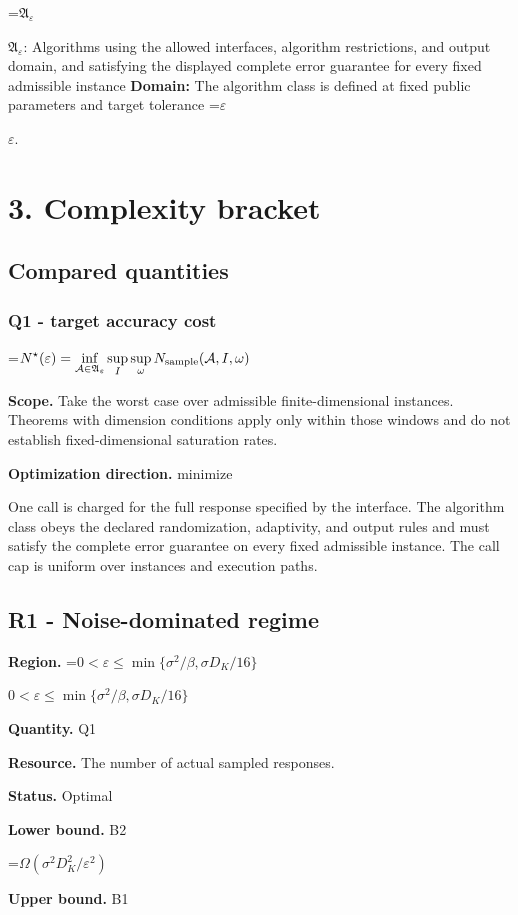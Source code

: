 \documentclass[10pt,a4paper]{article}
\newcommand{\AtlasMath}[1]{\par\begingroup\centering\setbox0=\hbox{$\displaystyle #1$}\ifdim\wd0>1.4\linewidth\typeout{ATLAS WIDE FORMULA: \the\wd0}\fi\ifdim\wd0>\linewidth\resizebox{\linewidth}{!}{\box0}\else\box0\fi\par\endgroup}
\newcommand{\AtlasInlineMath}[1]{\begingroup\setbox0=\hbox{$#1$}\ifdim\wd0>.4\linewidth\endgroup\AtlasMath{#1}\else\endgroup$#1$\fi}
\begin{document}
\AtlasInlineMath{\mathfrak A_\varepsilon}: Algorithms using the allowed interfaces, algorithm restrictions, and output domain, and satisfying the displayed complete error guarantee for every fixed admissible instance \textbf{Domain:} The algorithm class is defined at fixed public parameters and target tolerance \AtlasInlineMath{\varepsilon}.

\section{3. Complexity bracket}
\subsection{Compared quantities}
\subsubsection{Q1 - target accuracy cost}
\AtlasMath{N^\star(\varepsilon)=\inf_{\mathcal A\in\mathfrak A_\varepsilon}\sup_I \sup_\omega N_{\rm sample}(\mathcal A,I,\omega)}
\textbf{Scope.} Take the worst case over admissible finite-dimensional instances. Theorems with dimension conditions apply only within those windows and do not establish fixed-dimensional saturation rates.

\textbf{Optimization direction.} minimize

One call is charged for the full response specified by the interface. The algorithm class obeys the declared randomization, adaptivity, and output rules and must satisfy the complete error guarantee on every fixed admissible instance. The call cap is uniform over instances and execution paths.

\subsection{R1 - Noise-dominated regime}
\textbf{Region.} \AtlasInlineMath{0<\varepsilon\le\min\{\sigma^2/\beta,\sigma D_K/16\}}

\textbf{Quantity.} Q1

\textbf{Resource.} The number of actual sampled responses.

\textbf{Status.} Optimal

\textbf{Lower bound.} B2

\AtlasMath{\Omega(\sigma^2D_K^2/\varepsilon^2)}
\textbf{Upper bound.} B1
\end{document}
